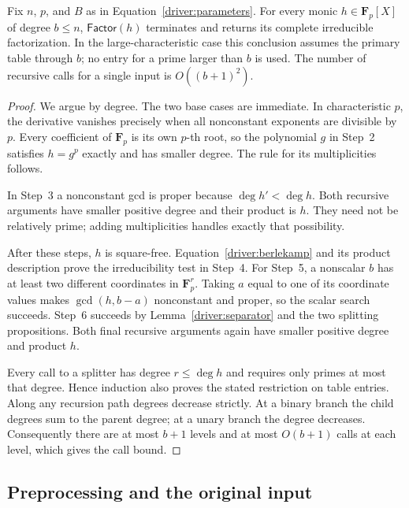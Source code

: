 \begin{proposition}
\label{driver:correctness}
\label{driver:factor}
Fix $n$, $p$, and $B$ as in Equation~\eqref{driver:parameters}.
For every monic $h\in\mathbf F_p[X]$ of degree $b\le n$,
$\mathsf{Factor}(h)$ terminates and returns its complete irreducible
factorization.  In the large-characteristic case this conclusion assumes
the primary table through $b$; no entry for a prime larger than $b$ is used.
The number of recursive calls for a single input is $O((b+1)^2)$.
\end{proposition}

\begin{proof}
We argue by degree.  The two base cases are immediate.  In characteristic
$p$, the derivative vanishes precisely when all nonconstant exponents are
divisible by $p$.  Every coefficient of $\mathbf F_p$ is its own $p$-th
root, so the polynomial $g$ in Step~2 satisfies $h=g^p$ exactly and has
smaller degree.  The rule for its multiplicities follows.

In Step~3 a nonconstant gcd is proper because $\deg h'<\deg h$.
Both recursive arguments have smaller positive degree and their product is
$h$.  They need not be relatively prime; adding multiplicities handles
exactly that possibility.

After these steps, $h$ is square-free.  Equation~\eqref{driver:berlekamp}
and its product description prove the irreducibility test in Step~4.
For Step~5, a nonscalar $b$ has at least two different coordinates in
$\mathbf F_p^r$.  Taking $a$ equal to one of its coordinate values makes
$\gcd(h,b-a)$ nonconstant and proper, so the scalar search succeeds.
Step~6 succeeds by Lemma~\ref{driver:separator} and the two splitting
propositions.  Both final recursive arguments again have smaller positive
degree and product $h$.

Every call to a splitter has degree $r\le\deg h$ and requires only primes
at most that degree.  Hence induction also proves the stated restriction
on table entries.  Along any recursion path degrees decrease strictly.
At a binary branch the child degrees sum to the parent degree; at a unary
branch the degree decreases.  Consequently there are at most $b+1$ levels
and at most $O(b+1)$ calls at each level, which gives the call bound.
\end{proof}

\subsection{Preprocessing and the original input}

